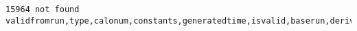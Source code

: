 \documentclass[8pt]{article}
\begin{document}
    \begin{Verbatim}[commandchars=\\\{\}]
15964 not found validfromrun,type,calonum,constants,generatedtime,isvalid,baserun,derivedsubrun


    \end{Verbatim}

    \begin{center}
    \end{center}
    { \hspace*{\fill} \\}
    

    
    
    
    
\end{document}
